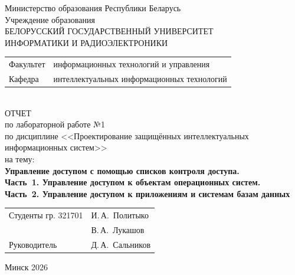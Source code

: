 \begin{titlepage}
	\begin{center}
		Министерство образования Республики Беларусь\\[1em]
		Учреждение образования\\
		БЕЛОРУССКИЙ ГОСУДАРСТВЕННЫЙ УНИВЕРСИТЕТ \\
		ИНФОРМАТИКИ И РАДИОЭЛЕКТРОНИКИ\\[1em]
		
		\begin{minipage}{\textwidth}
			\begin{flushleft}
				\begin{tabular}{ l l }
					Факультет & информационных технологий и управления\\
					Кафедра   & интеллектуальных информационных технологий
				\end{tabular}
			\end{flushleft}
		\end{minipage}\\[1em]
		
		{ОТЧЕТ}\\
		{по лабораторной работе №1}\\
		{по дисциплине <<Проектирование защищённых интеллектуальных}\\
		{информационных систем>>}\\
		{на тему:}\\[1em]
		\textbf{Управление доступом с помощью списков контроля доступа.}\\[0.4em]
		\textbf{Часть~1. Управление доступом к объектам операционных систем.}\\[0.25em]
		\textbf{Часть~2. Управление доступом к приложениям и системам базам данных}\\[1em]
		
		\vspace{2em}
		\begin{tabular}{ p{}p{} }
			Студенты гр. 321701 & И.\,А.~Политыко \\
			& В.\,А.~Лукашов \\
			Руководитель & Д.\,А.~Сальников \\
		\end{tabular}
		
		\vfill
		{\normalsize Минск 2026}
	\end{center}
\end{titlepage}

